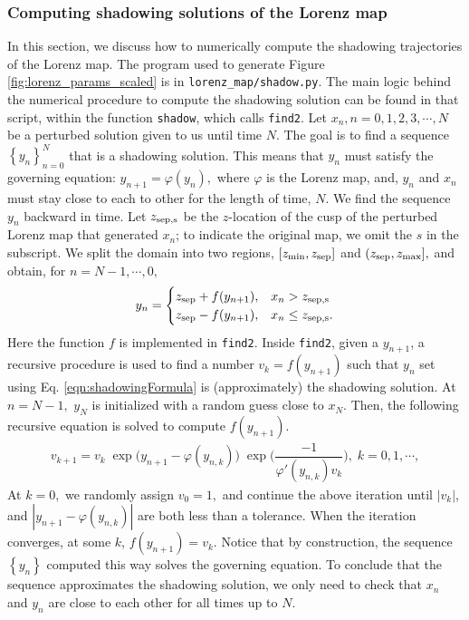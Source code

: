 \subsubsection{Computing shadowing solutions of the Lorenz map}
In this section, we discuss how to numerically compute the shadowing trajectories of the Lorenz map.  The program used to generate Figure 
\ref{fig:lorenz_params_scaled} is in \verb+lorenz_map/shadow.py+. The main logic behind the numerical procedure to compute the shadowing solution can be found in that script, within the function \verb+shadow+, which calls \verb+find2+. Let $x_n, n = 0,1,2,3,\cdots,N$ be a perturbed solution given to us until time $N$. The goal is to find a sequence $\left\{ y_n\right\}_{n=0}^{N}$ that is a shadowing solution. This means that $y_n$ must satisfy the governing equation: $y_{n+1} = \varphi(y_n),$ where $\varphi$ is the Lorenz map, and, 
$y_n$ and $x_n$ must stay close to each to other for the length of time, $N$. We find the sequence $y_n$ backward in time. Let $z_{\rm sep,s}$ be the $z$-location of the cusp of the perturbed Lorenz map that generated $x_n$; to indicate the original map, we omit the $s$ in the subscript. We split the domain into two regions, $[z_{\rm min}, z_{\rm sep}]$ and $(z_{\rm sep}, z_{\rm max}],$ and 
obtain, for $n = N-1, \cdots, 0,$
\begin{align}
    y_n = \begin{cases}
                     z_{\rm sep} + f(y_{n+1}), & x_n > z_{\rm sep, s} \\
                     z_{\rm sep} - f(y_{n+1}), & x_n \leq z_{\rm sep, s}.
    \end{cases}
    \label{eqn:shadowingFormula}
\end{align}
Here the function $f$ is implemented in 
\verb+find2+. Inside \verb+find2+, given a $y_{n+1}$, 
a recursive procedure is used to 
find a number $v_k = f(y_{n+1})$ such that $y_n$ set 
using Eq. \ref{eqn:shadowingFormula} is (approximately) the shadowing 
solution. At $n = N-1,$ $y_N$ is initialized with a random guess close to $x_N.$
Then, the following recursive equation is solved to compute $f(y_{n+1})$.
\begin{align}
        v_{k+1} = v_k \;  \exp{\big({y_{n+1} - \varphi(y_{n,k})}\big)} \; \exp{\Big(\dfrac{-1}{\varphi'(y_{n,k}) v_k}\Big)}, \; k = 0,1,\cdots,
\end{align}
At $k=0,$ we randomly assign $v_0 = 1,$ and continue the above iteration 
until $|v_k|$, and $|y_{n+1} - \varphi(y_{n,k})|$ are both less than 
a tolerance. When the iteration converges, at some $k$,
$f(y_{n+1}) = v_k.$ Notice that by construction, the
sequence $\left\{ y_n\right\}$ computed this way solves the governing equation.
To conclude that the sequence approximates the shadowing solution, we only need to check that $x_n$ and $y_n$ are close to each other for all times up to $N.$
